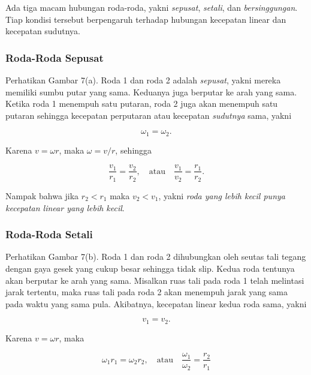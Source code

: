 \documentclass[12pt, a4paper]{article}\usepackage[utf8]{inputenc}
\theoremstyle{plain}
\theoremstyle{plain}
\numberwithin{equation}{section}
\theoremstyle{definition}
\begin{document}
	Ada tiga macam hubungan roda-roda, yakni \textit{sepusat}, \textit{setali}, dan \textit{bersinggungan}. Tiap kondisi tersebut berpengaruh terhadap hubungan kecepatan linear dan kecepatan sudutnya.
	
	\subsubsection{Roda-Roda Sepusat}
	
	Perhatikan Gambar 7(a). Roda 1 dan roda 2 adalah \textit{sepusat}, yakni mereka memiliki sumbu putar yang sama. Keduanya juga berputar ke arah yang sama. Ketika roda 1 menempuh satu putaran, roda 2 juga akan menempuh satu putaran sehingga kecepatan perputaran atau kecepatan \textit{sudutnya} sama, yakni
	
	\begin{equation}
		\omega_{1} = \omega_{2}.
	\end{equation}

	Karena $v = \omega r$, maka $\omega = v/r$, sehingga
	
	\begin{equation}
		\frac{v_1}{r_1} = \frac{v_2}{r_2}, \quad \text{atau} \quad \frac{v_1}{v_2} = \frac{r_1}{r_2}.
	\end{equation}

	Nampak bahwa jika $r_2 < r_1$ maka $v_2 < v_1$, yakni \textit{roda yang lebih kecil punya kecepatan linear yang lebih kecil}.
	
	\subsubsection{Roda-Roda Setali}
	
	Perhatikan Gambar 7(b). Roda 1 dan roda 2 dihubungkan oleh seutas tali tegang dengan gaya gesek yang cukup besar sehingga tidak slip. Kedua roda tentunya akan berputar ke arah yang sama. Misalkan ruas tali pada roda 1 telah melintasi jarak tertentu, maka ruas tali pada roda 2 akan menempuh jarak yang sama pada waktu yang sama pula. Akibatnya, kecepatan linear kedua roda sama, yakni
	
	\begin{equation}
		v_1 = v_2.
	\end{equation}
	
	Karena $v = \omega r$, maka
	
	\begin{equation}
		\omega_1 r_1 = \omega_2 r_2, \quad \text{atau} \quad \frac{\omega_1}{\omega_2} = \frac{r_2}{r_1}
	\end{equation}
	
\end{document}
